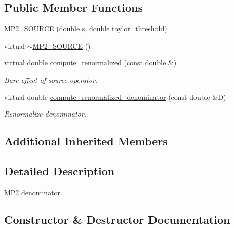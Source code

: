 \subsection*{Public Member Functions}
\begin{DoxyCompactItemize}
\item 
\mbox{\hyperlink{classforte_1_1_m_p2___s_o_u_r_c_e_af5d0a6a00863ec29d342db2b7afc1d99}{M\+P2\+\_\+\+S\+O\+U\+R\+CE}} (double s, double taylor\+\_\+threshold)
\item 
virtual \mbox{\hyperlink{classforte_1_1_m_p2___s_o_u_r_c_e_a7526c8a31e4f740ba960f611dd1313e6}{$\sim$\+M\+P2\+\_\+\+S\+O\+U\+R\+CE}} ()
\item 
virtual double \mbox{\hyperlink{classforte_1_1_m_p2___s_o_u_r_c_e_ac1a5dfafa00da98e4d60b49abfbf1ace}{compute\+\_\+renormalized}} (const double \&)
\begin{DoxyCompactList}\small\item\em Bare effect of source operator. \end{DoxyCompactList}\item 
virtual double \mbox{\hyperlink{classforte_1_1_m_p2___s_o_u_r_c_e_a7aabae75b519e6b52d8fc88626fc1895}{compute\+\_\+renormalized\+\_\+denominator}} (const double \&D)
\begin{DoxyCompactList}\small\item\em Renormalize denominator. \end{DoxyCompactList}\end{DoxyCompactItemize}
\subsection*{Additional Inherited Members}


\subsection{Detailed Description}
M\+P2 denominator. 

\subsection{Constructor \& Destructor Documentation}
\mbox{\label{classforte_1_1_m_p2___s_o_u_r_c_e_af5d0a6a00863ec29d342db2b7afc1d99}} 
